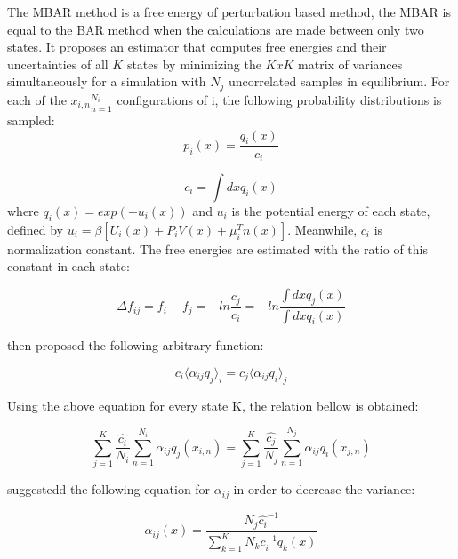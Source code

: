 The MBAR method is a free energy of perturbation based method, the MBAR is equal to the BAR method when the calculations are made between only two states. It proposes an estimator that computes free energies and their uncertainties of all $K$ states  by minimizing the $KxK$ matrix of variances simultaneously for a simulation with $N_{j}$ uncorrelated samples in equilibrium. For each of the ${x_{i,n}}_{n=1}^{N_{i}}$ configurations of i, the following probability distributions is sampled:
\begin{equation}
p_{i}(x) = \frac{q_{i}(x)}{c_{i}}
\end{equation}

\begin{equation}
c_{i} = \int dx q_{i}(x)
\end{equation}
where $q_{i}(x)=exp(-u_{i}(x))$ and $u_{i}$ is the potential energy of each state, defined by $u_{i}= \beta [U_{i}(x)+P_{i}V(x) + \mu _{i}^{T}n(x)]$. Meanwhile, $c_{i}$ is normalization constant.  The free energies are estimated with the ratio of this constant in each state:

\begin{equation}
\Delta f_{ij} = f_{i} - f_{j} = - ln \frac{c_{j}}{c_{i}}  = -ln \frac{\int dx q_{j}(x)}{\int dx q_{i}(x)} 
\end{equation}

 then proposed the following arbitrary function:

\begin{equation}
c_{i} \langle \alpha _{ij} q_{j} \rangle _{i}  =  c_{j} \langle \alpha _{ij} q_{i} \rangle _{j} 
\end{equation}

Using the above equation for every state  K, the relation bellow is obtained:

\begin{equation}
\label{eq:mbar1}
\sum_{j=1}^{K} \frac{\hat{c_{i}}}{N_{i}} \sum_{n=1}^{N_{i}} \alpha _{ij} q_{j} (x_{i,n}) =  \sum_{j=1}^{K} \frac{\hat{c_{j}}}{N_{j}} \sum_{n=1}^{N_{j}} \alpha _{ij} q_{i} (x_{j,n})
\end{equation}

 suggestedd the following equation for $\alpha _{ij}$ in order to decrease the variance:

\begin{equation}
\label{eq:mbar2}
\alpha _{ij} (x) = \frac{N_{j} \hat{c_{i}} ^{-1}}{\sum_{k=1}^{K} N_{k} c_{i} ^{-1} q_{k}(x)}
\end{equation}

